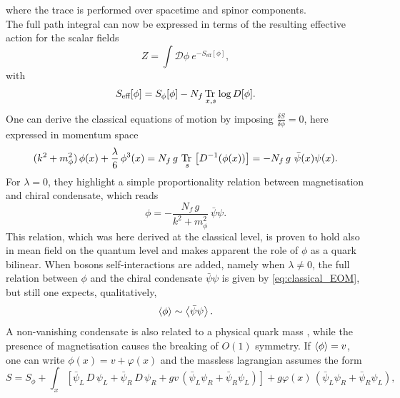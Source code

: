 where the trace is performed over spacetime and spinor components. \\ 
The full path integral can now be expressed in terms of the resulting effective action for the scalar fields
\begin{equation*}
    Z = \int \mathcal{D}\phi \ e^{-S_\text{eff}[\phi]},
\end{equation*}
with
\begin{equation}
    S_\text{eff}[\phi] = S_{\phi}[\phi] - N_f \, \underset{x,s}{\operatorname{\text{Tr} \,}} \log D[\phi].
    \label{eq:effective_action_no_fermions}
\end{equation}
One can derive the classical equations of motion by imposing $\frac{\delta S}{\delta \phi} = 0$, here expressed in momentum space
\begin{equation}
     (k^2 + m_\phi^2) \, \phi(x) + \frac{\lambda}{6} \, \phi^3(x) = N_f \, g \ \underset{s}{\tr} \left[D^{-1}(\phi(x))\right] = - N_f \, g \ \bar\psi(x) \psi(x).
     \label{eq:classical_EOM_full}
\end{equation}
For $\lambda = 0$, they highlight a simple proportionality relation between magnetisation and chiral condensate, which reads
\begin{equation}
    \phi = - \frac{N_f \, g}{k^2 + m_\phi^2} \ \bar \psi\psi.
    \label{eq:classical_EOM}
\end{equation}
This relation, which was here derived at the classical level, is proven to hold also in mean field on the quantum level \cite{Ayala2021QCDDescriptions} and makes apparent the role of $\phi$ as a quark bilinear.
When bosons self-interactions are added, namely when $\lambda \neq 0$, the full relation between $\phi$ and the chiral condensate $\bar\psi\psi$ is given by \eqref{eq:classical_EOM}, but still one expects, qualitatively,
\begin{equation}
    \left\langle \phi \right\rangle \sim \left\langle \bar\psi\psi \right\rangle.
    \label{eq:qualitative_relation_condensate_magnetisation}
\end{equation}
A non-vanishing condensate is also related to a physical quark mass \cite{Ayala2021QCDDescriptions,MANOHAR1984189}, while the presence of magnetisation causes the breaking of $O(1)$ symmetry.
If $\left\langle \phi \right\rangle = v$, one can write $\phi(x) = v + \varphi(x)$ and the massless lagrangian assumes the form 
\begin{equation}
	S = S_\phi +  \int_x \left[\bar\psi_L \, D \, \psi_L + \bar\psi_R \, D \, \psi_R + gv \, \left(\bar\psi_L\psi_R + \bar\psi_R\psi_L\right)\right] + g\varphi(x) \, \left(\bar\psi_L\psi_R + \bar\psi_R\psi_L\right),
	\label{eq:background_field}
\end{equation}
